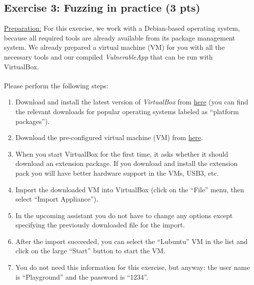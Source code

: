 \documentclass [11pt, a4wide, twoside]{article}
\begin{document}
\subsection*{Exercise 3: Fuzzing in practice (3 pts)}
\underline{Preparation:}
For this exercise, we work with a Debian-based operating system, because all required tools are already available from its package management system. We already prepared a virtual machine (VM) for you with all the necessary tools and our compiled \emph{VulnerableApp} that can be run with VirtualBox.\\\\
Please perform the following steps:
\begin{enumerate}
\item Download and install the latest version of \emph{VirtualBox} from \href{https://www.virtualbox.org/wiki/Downloads}{here} (you can find the relevant downloads for popular operating systems labeled as ``platform packages'').
\item Download the pre-configured virtual machine (VM) from \href{https://drive.google.com/file/d/19Cc-R9RhlbQMF38PLlkYsrILgom9C3SM/view?usp=sharing}{here}.
\item When you start VirtualBox for the first time, it asks whether it should download an extension package. If you download and install the extension pack you will have better hardware support in the VMs, \eg USB3, etc.
\item Import the downloaded VM into VirtualBox (click on the ``File'' menu, then select ``Import Appliance'').
\item In the upcoming assistant you do not have to change any options except specifying the previously downloaded file for the import.
\item After the import succeeded, you can select the ``Lubuntu'' VM in the list and click on the large ``Start'' button to start the VM.
\item You do not need this information for this exercise, but anyway: the user name is ``Playground'' and the password is ``1234''.
\end{enumerate}
\end{document}
